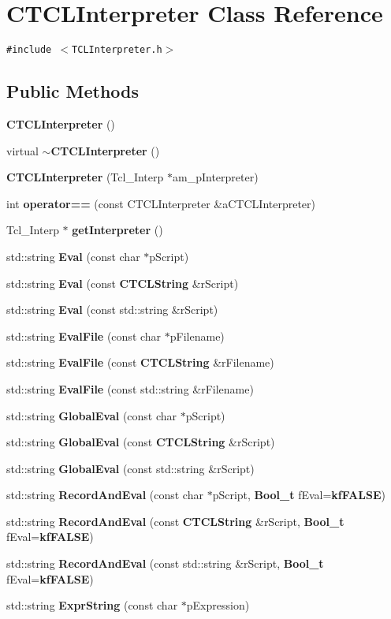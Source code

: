 \section{CTCLInterpreter  Class Reference}
\label{classCTCLInterpreter}
{\tt \#include $<$TCLInterpreter.h$>$}

\subsection*{Public Methods}
\begin{CompactItemize}
\item 
{\bf CTCLInterpreter} ()
\item 
virtual {\bf $\sim$CTCLInterpreter} ()
\item 
{\bf CTCLInterpreter} (Tcl\_\-Interp $\ast$am\_\-p\-Interpreter)
\item 
int {\bf operator==} (const CTCLInterpreter \&a\-CTCLInterpreter)
\item 
Tcl\_\-Interp $\ast$ {\bf get\-Interpreter} ()
\item 
std::string {\bf Eval} (const char $\ast$p\-Script)
\item 
std::string {\bf Eval} (const {\bf CTCLString} \&r\-Script)
\item 
std::string {\bf Eval} (const std::string \&r\-Script)
\item 
std::string {\bf Eval\-File} (const char $\ast$p\-Filename)
\item 
std::string {\bf Eval\-File} (const {\bf CTCLString} \&r\-Filename)
\item 
std::string {\bf Eval\-File} (const std::string \&r\-Filename)
\item 
std::string {\bf Global\-Eval} (const char $\ast$p\-Script)
\item 
std::string {\bf Global\-Eval} (const {\bf CTCLString} \&r\-Script)
\item 
std::string {\bf Global\-Eval} (const std::string \&r\-Script)
\item 
std::string {\bf Record\-And\-Eval} (const char $\ast$p\-Script, {\bf Bool\_\-t} f\-Eval={\bf kf\-FALSE})
\item 
std::string {\bf Record\-And\-Eval} (const {\bf CTCLString} \&r\-Script, {\bf Bool\_\-t} f\-Eval={\bf kf\-FALSE})
\item 
std::string {\bf Record\-And\-Eval} (const std::string \&r\-Script, {\bf Bool\_\-t} f\-Eval={\bf kf\-FALSE})
\item 
std::string {\bf Expr\-String} (const char $\ast$p\-Expression)

\end{CompactItemize}
